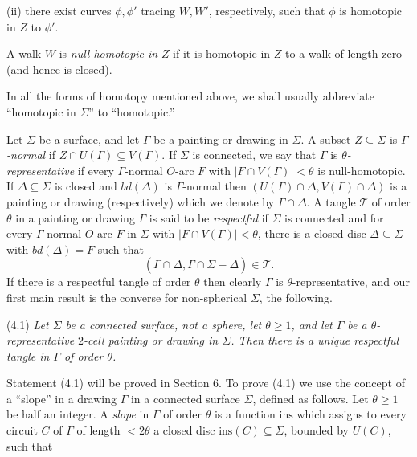 \hspace*{12pt}(ii) there exist curves $\phi, \phi'$ tracing $W, W'$, respectively, such that $\phi$ is homotopic in $Z$ to $\phi'$.

A walk $W$ is \textit{null-homotopic in} $Z$ if it is homotopic in $Z$ to a walk of length zero (and hence is closed).

In all the forms of homotopy mentioned above, we shall usually abbreviate ``homotopic in $\Sigma$'' to ``homotopic.''


Let $\Sigma$ be a surface, and let $\Gamma$ be a painting or drawing in $\Sigma$. A subset $Z \subseteq \Sigma$ is \textit{$\Gamma$-normal} if $Z \cap U(\Gamma) \subseteq V(\Gamma)$. If $\Sigma$ is connected, we say that $\Gamma$ is \textit{$\theta$-representative} if every $\Gamma$-normal $O$-arc $F$ with $|F \cap V(\Gamma)| < \theta$ is null-homotopic. If $\Delta \subseteq \Sigma$ is closed and $bd(\Delta)$ is $\Gamma$-normal then $(U(\Gamma) \cap \Delta, V(\Gamma) \cap \Delta)$ is a painting or drawing (respectively) which we denote by $\Gamma \cap \Delta$. A tangle $\mathscr{T}$ of order $\theta$ in a painting or drawing $\Gamma$ is said to be \textit{respectful} if $\Sigma$ is connected and for every $\Gamma$-normal $O$-arc $F$ in $\Sigma$ with $|F \cap V(\Gamma)| < \theta$, there is a closed disc $\Delta \subseteq \Sigma$ with $bd(\Delta) = F$ such that
\begin{equation*}
(\Gamma \cap \Delta, \Gamma \cap \overline{\Sigma - \Delta}) \in \mathscr{T}.
\end{equation*}
If there is a respectful tangle of order $\theta$ then clearly $\Gamma$ is $\theta$-representative, and our first main result is the converse for non-spherical $\Sigma$, the following.

\stmt
(4.1) \textit{Let $\Sigma$ be a connected surface, not a sphere, let $\theta \ge 1$, and let $\Gamma$ be a $\theta$-representative $2$-cell painting or drawing in $\Sigma$. Then there is a unique respectful tangle in $\Gamma$ of order $\theta$.}

Statement (4.1) will be proved in Section 6. To prove (4.1) we use the concept of a ``slope'' in a drawing $\Gamma$ in a connected surface $\Sigma$, defined as follows. Let $\theta \ge 1$ be half an integer. A \textit{slope} in $\Gamma$ of order $\theta$ is a function $\text{ins}$ which assigns to every circuit $C$ of $\Gamma$ of length $< 2\theta$ a closed disc $\text{ins}(C) \subseteq \Sigma$, bounded by $U(C)$, such that

